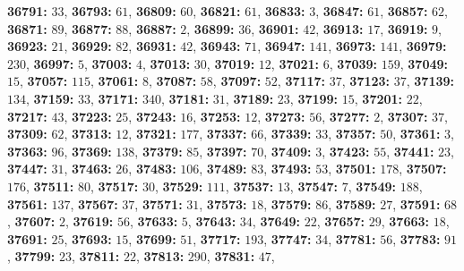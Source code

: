 \textsf{\bfseries 36791:} $33$, \textsf{\bfseries 36793:} $61$, \textsf{\bfseries 36809:} $60$, \textsf{\bfseries 36821:} $61$, \textsf{\bfseries 36833:} $3$, \textsf{\bfseries 36847:} $61$, \textsf{\bfseries 36857:} $62$, \textsf{\bfseries 36871:} $89$, \textsf{\bfseries 36877:} $88$, \textsf{\bfseries 36887:} $2$, \textsf{\bfseries 36899:} $36$, \textsf{\bfseries 36901:} $42$, \textsf{\bfseries 36913:} $17$, \textsf{\bfseries 36919:} $9$, \textsf{\bfseries 36923:} $21$, \textsf{\bfseries 36929:} $82$, \textsf{\bfseries 36931:} $42$, \textsf{\bfseries 36943:} $71$, \textsf{\bfseries 36947:} $141$, \textsf{\bfseries 36973:} $141$, \textsf{\bfseries 36979:} $230$, \textsf{\bfseries 36997:} $5$, \textsf{\bfseries 37003:} $4$, \textsf{\bfseries 37013:} $30$, \textsf{\bfseries 37019:} $12$, \textsf{\bfseries 37021:} $6$, \textsf{\bfseries 37039:} $159$, \textsf{\bfseries 37049:} $15$, \textsf{\bfseries 37057:} $115$, \textsf{\bfseries 37061:} $8$, \textsf{\bfseries 37087:} $58$, \textsf{\bfseries 37097:} $52$, \textsf{\bfseries 37117:} $37$, \textsf{\bfseries 37123:} $37$, \textsf{\bfseries 37139:} $134$, \textsf{\bfseries 37159:} $33$, \textsf{\bfseries 37171:} $340$, \textsf{\bfseries 37181:} $31$, \textsf{\bfseries 37189:} $23$, \textsf{\bfseries 37199:} $15$, \textsf{\bfseries 37201:} $22$, \textsf{\bfseries 37217:} $43$, \textsf{\bfseries 37223:} $25$, \textsf{\bfseries 37243:} $16$, \textsf{\bfseries 37253:} $12$, \textsf{\bfseries 37273:} $56$, \textsf{\bfseries 37277:} $2$, \textsf{\bfseries 37307:} $37$, \textsf{\bfseries 37309:} $62$, \textsf{\bfseries 37313:} $12$, \textsf{\bfseries 37321:} $177$, \textsf{\bfseries 37337:} $66$, \textsf{\bfseries 37339:} $33$, \textsf{\bfseries 37357:} $50$, \textsf{\bfseries 37361:} $3$, \textsf{\bfseries 37363:} $96$, \textsf{\bfseries 37369:} $138$, \textsf{\bfseries 37379:} $85$, \textsf{\bfseries 37397:} $70$, \textsf{\bfseries 37409:} $3$, \textsf{\bfseries 37423:} $55$, \textsf{\bfseries 37441:} $23$, \textsf{\bfseries 37447:} $31$, \textsf{\bfseries 37463:} $26$, \textsf{\bfseries 37483:} $106$, \textsf{\bfseries 37489:} $83$, \textsf{\bfseries 37493:} $53$, \textsf{\bfseries 37501:} $178$, \textsf{\bfseries 37507:} $176$, \textsf{\bfseries 37511:} $80$, \textsf{\bfseries 37517:} $30$, \textsf{\bfseries 37529:} $111$, \textsf{\bfseries 37537:} $13$, \textsf{\bfseries 37547:} $7$, \textsf{\bfseries 37549:} $188$, \textsf{\bfseries 37561:} $137$, \textsf{\bfseries 37567:} $37$, \textsf{\bfseries 37571:} $31$, \textsf{\bfseries 37573:} $18$, \textsf{\bfseries 37579:} $86$, \textsf{\bfseries 37589:} $27$, \textsf{\bfseries 37591:} $68$, \textsf{\bfseries 37607:} $2$, \textsf{\bfseries 37619:} $56$, \textsf{\bfseries 37633:} $5$, \textsf{\bfseries 37643:} $34$, \textsf{\bfseries 37649:} $22$, \textsf{\bfseries 37657:} $29$, \textsf{\bfseries 37663:} $18$, \textsf{\bfseries 37691:} $25$, \textsf{\bfseries 37693:} $15$, \textsf{\bfseries 37699:} $51$, \textsf{\bfseries 37717:} $193$, \textsf{\bfseries 37747:} $34$, \textsf{\bfseries 37781:} $56$, \textsf{\bfseries 37783:} $91$, \textsf{\bfseries 37799:} $23$, \textsf{\bfseries 37811:} $22$, \textsf{\bfseries 37813:} $290$, \textsf{\bfseries 37831:} $47$, 
